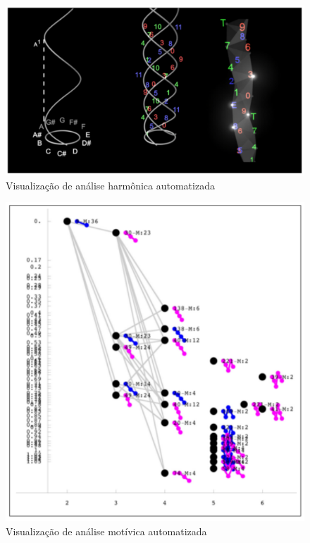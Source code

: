 \documentclass{sciposter}
\begin{document}
\begin{multicols}{2}
\begin{figure}
  \centering
  \includegraphics{./figs/bain-realtime.pdf}
  \caption{Visualização de análise harmônica automatizada \cite{Bain2008}}
  \label{fig:label-figura}
\end{figure}

\begin{figure}
  \centering
  \includegraphics{./figs/buteau-motivic.pdf}
  \caption{Visualização de análise motívica automatizada \cite{Buteau2005}}
  \label{fig:label-figura}
\end{figure}


\end{multicols}
\end{document}
